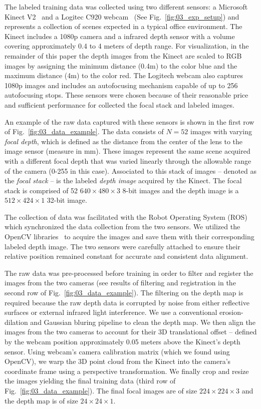 \documentclass[letterpaper, 10 pt, conference]{ieeeconf}  %
\begin{document}
The labeled training data was collected using two different sensors: a Microsoft Kinect V2~\cite{Kinect} and a Logitec C920 webcam~\cite{Logitech} (See Fig.~\ref{fig:03_exp_setup}) and represents a collection of scenes expected in a typical office environment. 
The Kinect includes a 1080p camera and a infrared depth sensor with a volume covering approximately 0.4 to 4 meters of depth range. For visualization, in the remainder of this paper the depth images from the Kinect are scaled to RGB images by assigning the minimum distance (0.4m) to the color blue and the maximum distance (4m) to the color red. The Logitech webcam also captures 1080p images and includes an autofocusing mechanism capable of up to 256 autofocusing stops. 
These sensors were chosen because of their reasonable price and sufficient performance for collected the focal stack and labeled images. 

An example of the raw data captured with these sensors is shown in the first row of Fig.~\ref{fig:03_data_example}. The data consists of $N=52$ images with varying \textit{focal depth}, which is defined as the distance from the center of the lens to the image sensor (measure in mm). These images represent the same scene acquired with a different focal depth that was varied linearly through the allowable range of the camera (0-255 in this case). Associated to this stack of images -- denoted as the \textit{focal stack} -- is the labeled \textit{depth image} acquired by the Kinect. The focal stack is comprised of 52 $640 \times 480 \times 3$ 8-bit images and the depth image is a $512 \times 424 \times 1$ 32-bit image. 

The collection of data was facilitated with the Robot Operating System (ROS)~\cite{Quiqley2009ROS} which synchronized the data collection from the two sensors. We utilized the OpenCV libraries~\cite{bradski2008learning} to acquire the images and save them with their corresponding labeled depth image. The two sensors were carefully attached to ensure their relative position remained constant for accurate and consistent data alignment. 

The raw data was pre-processed before training in order to filter and register the images from the two cameras (see results of filtering and registration in the second row of Fig.~\ref{fig:03_data_example}). The filtering on the depth map is required because the raw depth data is corrupted by noise from either reflective surfaces or external infrared light interference. We use a conventional erosion-dilation and Gaussian bluring pipeline to clean the depth map. We then align the images from the two cameras to account for their 3D translational offset -- defined by the webcam position approximately 0.05 meters above the Kinect's depth sensor. Using webcam's camera calibration matrix (which we found using OpenCV), we warp the 3D point cloud from the Kinect into the camera's coordinate frame using a perspective transformation. We finally crop and resize the images yielding the final training data (third row of Fig.~\ref{fig:03_data_example}). The final focal images are of size $224 \times 224 \times 3$ and the depth map is of size $24 \times 24 \times 1$. 
\end{document}
